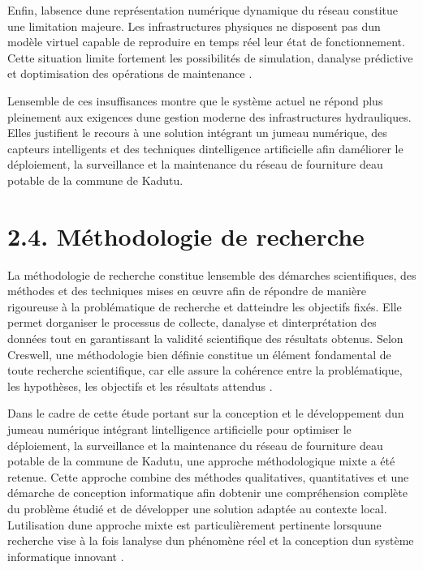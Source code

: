 \documentclass[12pt,a4paper,oneside]{report}
\begin{document}
Enfin, l\textquotesingle absence d\textquotesingle une représentation
numérique dynamique du réseau constitue une limitation majeure. Les
infrastructures physiques ne disposent pas d\textquotesingle un modèle
virtuel capable de reproduire en temps réel leur état de fonctionnement.
Cette situation limite fortement les possibilités de simulation,
d\textquotesingle analyse prédictive et d\textquotesingle optimisation
des opérations de maintenance \cite{ref61}.

L\textquotesingle ensemble de ces insuffisances montre que le système
actuel ne répond plus pleinement aux exigences d\textquotesingle une
gestion moderne des infrastructures hydrauliques. Elles justifient le
recours à une solution intégrant un jumeau numérique, des capteurs
intelligents et des techniques d\textquotesingle intelligence
artificielle afin d\textquotesingle améliorer le déploiement, la
surveillance et la maintenance du réseau de fourniture
d\textquotesingle eau potable de la commune de Kadutu.

\section{\texorpdfstring{\textbf{2.4. Méthodologie de
recherche}}{2.4. Méthodologie de recherche}}\label{muxe9thodologie-de-recherche}

La méthodologie de recherche constitue l\textquotesingle ensemble des
démarches scientifiques, des méthodes et des techniques mises en œuvre
afin de répondre de manière rigoureuse à la problématique de recherche
et d\textquotesingle atteindre les objectifs fixés. Elle permet
d\textquotesingle organiser le processus de collecte,
d\textquotesingle analyse et d\textquotesingle interprétation des
données tout en garantissant la validité scientifique des résultats
obtenus. Selon Creswell, une méthodologie bien définie constitue un
élément fondamental de toute recherche scientifique, car elle assure la
cohérence entre la problématique, les hypothèses, les objectifs et les
résultats attendus \cite{ref75}.

Dans le cadre de cette étude portant sur la conception et le
développement d\textquotesingle un jumeau numérique intégrant
l\textquotesingle intelligence artificielle pour optimiser le
déploiement, la surveillance et la maintenance du réseau de fourniture
d\textquotesingle eau potable de la commune de Kadutu, une approche
méthodologique mixte a été retenue. Cette approche combine des méthodes
qualitatives, quantitatives et une démarche de conception informatique
afin d\textquotesingle obtenir une compréhension complète du problème
étudié et de développer une solution adaptée au contexte local.
L\textquotesingle utilisation d\textquotesingle une approche mixte est
particulièrement pertinente lorsqu\textquotesingle une recherche vise à
la fois l\textquotesingle analyse d\textquotesingle un phénomène réel et
la conception d\textquotesingle un système informatique innovant
\cite{ref100}.
\end{document}
